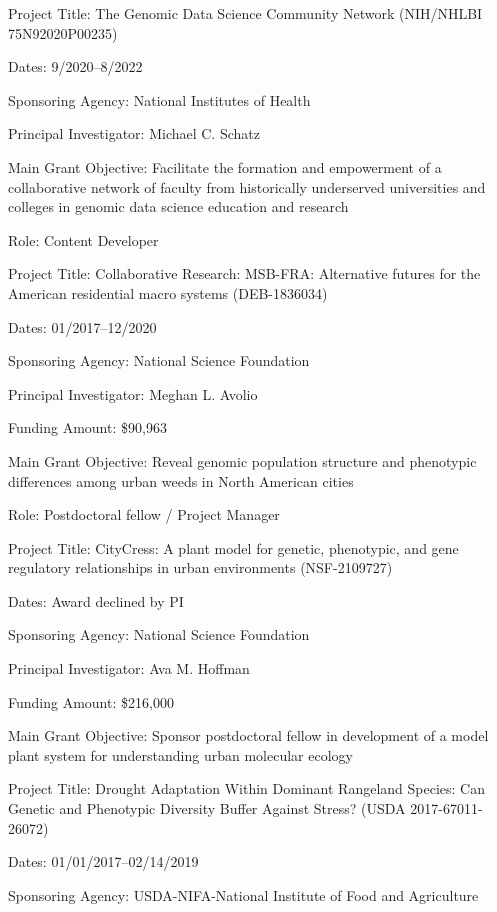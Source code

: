 \documentclass{cv}
\begin{document}
Project Title: The Genomic Data Science Community Network (NIH/NHLBI 75N92020P00235)

Dates: 9/2020--8/2022

Sponsoring Agency: National Institutes of Health

Principal Investigator: Michael C. Schatz

Main Grant Objective: Facilitate the formation and empowerment of a collaborative network of faculty from historically underserved universities and colleges in genomic data science education and research

Role: Content Developer

\vspace{5mm}

Project Title: Collaborative Research: MSB-FRA: Alternative futures for the American residential macro systems (DEB-1836034)

Dates: 01/2017--12/2020

Sponsoring Agency: National Science Foundation

Principal Investigator: Meghan L. Avolio

Funding Amount: \$90,963

Main Grant Objective: Reveal genomic population structure and phenotypic differences among urban weeds in North American cities

Role: Postdoctoral fellow / Project Manager

\vspace{5mm}

Project Title: CityCress: A plant model for genetic, phenotypic, and gene regulatory relationships in urban environments (NSF-2109727)

Dates: Award declined by PI

Sponsoring Agency: National Science Foundation

Principal Investigator: Ava M. Hoffman

Funding Amount: \$216,000

Main Grant Objective: Sponsor postdoctoral fellow in development of a model plant system for understanding urban molecular ecology

\vspace{5mm}

Project Title: Drought Adaptation Within Dominant Rangeland Species: Can Genetic and Phenotypic Diversity Buffer Against Stress? (USDA 2017-67011-26072)

Dates: 01/01/2017--02/14/2019

Sponsoring Agency: USDA-NIFA-National Institute of Food and Agriculture
\end{document}
